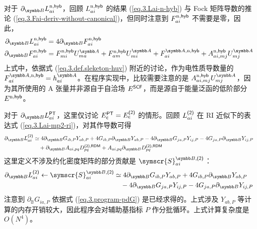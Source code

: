 对于 $\partial_\mathbb{B} L_{ai}^{\mathrm{n}, \textmt{hyb}}$，回顾 $L_{ai}^{\mathrm{n}, \textsf{hyb}}$ 的结果 (\ref{eq.3.Lai-n-hyb}) 与 Fock 矩阵导数的推论 (\ref{eq.3.Fai-deriv-without-canonical})，但同时注意到 $F_{ai}^{\mathrm{n}, \textsf{hyb}}$ 不需要是零，因此，
\begin{align}
    \partial_\mathbb{B} L_{ai}^{\mathrm{n}, \textmt{hyb}} &= 4 \partial_\mathbb{B} F_{ai}^{\mathrm{n}, \textmt{hyb}} \\
    \partial_\mathbb{B} F_{ai}^{\mathrm{n}, \textmt{hyb}} &= F_{mi}^{\mathrm{n}, \textmt{hyb}} U_{ma}^\mathbb{A} + F_{am}^{\mathrm{n}, \textmt{hyb}} U_{mi}^\mathbb{A} + F_{ai}^{\mathbb{A}, \mathrm{n}, \textmt{hyb}} + A_{ai, mj}^{\mathrm{n}, \textmt{hyb}} U_{mj}^\mathbb{A}
\end{align}
上式中，依据式 (\ref{eq.3.def.sleketon-huv}) 附近的讨论，作为电性质导数量的 $F_{ai}^{\mathbb{A}, \mathrm{n}, \textmt{hyb}} = h_{ai}^\mathbb{A}$。在程序实现中，比较需要注意的是 $A_{ai, mj}^{\mathrm{n}, \textmt{hyb}} U_{mj}^\mathbb{A}$，因为其所使用的 A 张量并非源自于自洽场 $E^{\textsf{SCF}}$，而是源自于能量泛函的低阶部分 $E^{\mathrm{n}, \textsf{hyb}}$。

对于 $\partial_\mathbb{B} L_{ai}^\textmt{PT}$，这里仅讨论 $E_{\textsf{c}}^{\textsf{PT}} = E_{\textsf{c}}^{\textsf{(2)}}$ 的情形。回顾 $L_{ai}^{\textsf{(2)}}$ 在 RI 近似下的表达式 (\ref{eq.3.Lai-mp2-ri})，对其作导数可得
\begin{align}
    \partial_\mathbb{B} L_{ai}^\textmt{(2)} &\simeq 4 \partial_\mathbb{B} G_{ib, P} Y_{ab, P} + 4 G_{ib, P} \partial_\mathbb{B} Y_{ab, P} - 4 \partial_\mathbb{B} G_{ja, P} Y_{ij, P} - 4 G_{ja, P} \partial_\mathbb{B} Y_{ij, P} \notag\\
    &\quad + \partial_\mathbb{B} A_{ai, pq} D_{pq}^{\textmt{(2)}, \textmt{RDM}} + A_{ai, pq} \partial_\mathbb{B} D_{pq}^{\textmt{(2)}, \textmt{RDM}}
\end{align}
这里定义不涉及约化密度矩阵的部分贡献是 $\symscr{S}_{ai}^{\mathbb{B}, \textmt{(2)}}$：
\begin{align}
    \label{eq.3.def.SCR3}
    \partial_\mathbb{B} L_{ai}^\textmt{(2)} \leftarrow \symscr{S}_{ai}^{\mathbb{B}, \textmt{(2)}} &\simeq 4 \partial_\mathbb{B} G_{ib, P} Y_{ab, P} + 4 G_{ib, P} \partial_\mathbb{B} Y_{ab, P} \notag\\
    &\quad - 4 \partial_\mathbb{B} G_{ja, P} Y_{ij, P} - 4 G_{ja, P} \partial_\mathbb{B} Y_{ij, P}
\end{align}
注意到 $\partial_\mathbb{B} G_{ia, P}$ 依据式 (\ref{eq.3.program-pdG}) 是已经求得的。上式涉及 $Y_{ab, P}$ 等计算的内存开销较大，因此程序会对辅助基指标 $P$ 作分批循环。上式计算复杂度是 $O(N^4)$。

